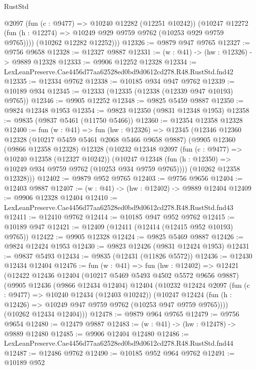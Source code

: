 \begin{lexlean}{RustStd}
\begin{coremodule}
          @2097
          (fun (c : @9477) => @10240 @12282 (@12251 @10242))
          (@10247 @12272 (fun (h : @12274) => @10249 @929 @9759 @9762 (@10253 @929 @9759 @9765))))
        (@10262 @12282 @12252)))
@12326 := @9879 @947 @9765
@12327 := @9756 @9658
@12328 := @12327 @9887
@12331 := (w : @41) -> (hw : @12326) -> @9889 @12328
@12333 := @9906 @12252 @12328
@12334 := LexLeanPreserve.Cae4456d77aa62528ed0bd9d0612cd278.R48.RustStd.fnd42
@12335 := @12334 @9762
@12338 := @10185 @934 @947 @9762
@12339 := @10189 @934
@12345 := @12333 (@12335 (@12338 (@12339 @947 @10193) @9765))
@12346 := @9905 @12252
@12348 := @9825 @5459 @9887
@12350 := @9824 @12348 @1953
@12354 := @9823 @12350 (@9831 @12348 @1953)
@12358 := @9835 (@9837 @5461 (@11750 @5466))
@12360 := @12354 @12358 @12328
@12400 := fun (w : @41) =>
  fun (hw : @12326) =>
  @12345
    (@12346
      @12360
      @12328
      (@10217 @5459 @5461 @2068 @5466 @9658 @9887)
      (@9905
        @12360
        (@9866 @12358 @12328)
        @12328
        (@10232
          @12348
          @2097
          (fun (c : @9477) => @10240 @12358 (@12327 @10242))
          (@10247 @12348 (fun (h : @12350) => @10249 @934 @9759 @9762 (@10253 @934 @9759 @9765))))
        (@10262 @12358 @12328)))
@12402 := @9879 @952 @9765
@12403 := @9756 @9656
@12404 := @12403 @9887
@12407 := (w : @41) -> (hw : @12402) -> @9889 @12404
@12409 := @9906 @12328 @12404
@12410 := LexLeanPreserve.Cae4456d77aa62528ed0bd9d0612cd278.R48.RustStd.fnd43
@12411 := @12410 @9762
@12414 := @10185 @947 @952 @9762
@12415 := @10189 @947
@12421 := @12409 (@12411 (@12414 (@12415 @952 @10193) @9765))
@12422 := @9905 @12328
@12424 := @9825 @5469 @9887
@12426 := @9824 @12424 @1953
@12430 := @9823 @12426 (@9831 @12424 @1953)
@12431 := @9837 @5493
@12434 := @9835 (@12431 (@11826 @5572))
@12436 := @12430 @12434 @12404
@12476 := fun (w : @41) =>
  fun (hw : @12402) =>
  @12421
    (@12422
      @12436
      @12404
      (@10217 @5469 @5493 @4502 @5572 @9656 @9887)
      (@9905
        @12436
        (@9866 @12434 @12404)
        @12404
        (@10232
          @12424
          @2097
          (fun (c : @9477) => @10240 @12434 (@12403 @10242))
          (@10247 @12424 (fun (h : @12426) => @10249 @947 @9759 @9762 (@10253 @947 @9759 @9765))))
        (@10262 @12434 @12404)))
@12478 := @9879 @964 @9765
@12479 := @9756 @9654
@12480 := @12479 @9887
@12483 := (w : @41) -> (hw : @12478) -> @9889 @12480
@12485 := @9906 @12404 @12480
@12486 := LexLeanPreserve.Cae4456d77aa62528ed0bd9d0612cd278.R48.RustStd.fnd44
@12487 := @12486 @9762
@12490 := @10185 @952 @964 @9762
@12491 := @10189 @952

\end{coremodule}
\end{lexlean}

